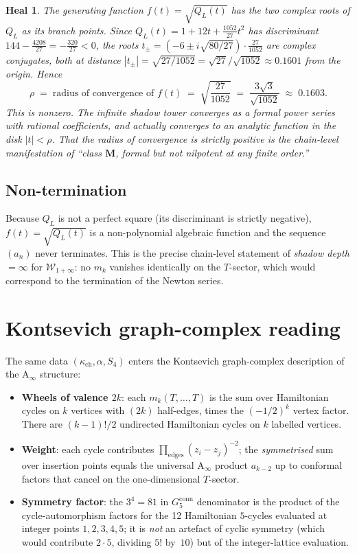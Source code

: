 \documentclass[11pt]{article}
\newtheorem*{heal}{Heal}
\newcommand{\kch}{\kappa_{\mathrm{ch}}}
\newcommand{\Winf}{\mathcal{W}_{1+\infty}}
\newcommand{\conn}{\mathrm{conn}}
\begin{document}
\begin{heal}
The generating function $f(t)=\sqrt{Q_L(t)}$ has the two complex
roots of $Q_L$ as its branch points. Since $Q_L(t) =
1 + 12t + \tfrac{1052}{27}t^2$ has discriminant
$144-\tfrac{4208}{27} = -\tfrac{320}{27} < 0$, the roots
$t_\pm = (-6\pm i\sqrt{80/27})\cdot\tfrac{27}{1052}$ are complex
conjugates, both at distance
$|t_\pm| = \sqrt{27/1052}=\sqrt{27}/\sqrt{1052}\approx 0.1601$
from the origin. Hence
\[
\rho\;=\;\text{radius of convergence of }f(t)\;=\;\sqrt{\frac{27}{1052}}
\;=\;\frac{3\sqrt{3}}{\sqrt{1052}}\;\approx\;0.1603.
\]
This is nonzero. The infinite shadow tower converges as a formal
power series with rational coefficients, and actually converges
to an analytic function in the disk $|t|<\rho$. That the radius of
convergence is strictly positive is the chain-level manifestation of
``class $\mathbf{M}$, formal but not nilpotent at any finite order.''
\end{heal}

\subsection{Non-termination}

Because $Q_L$ is not a perfect square (its discriminant is strictly
negative), $f(t)=\sqrt{Q_L(t)}$ is a non-polynomial algebraic function
and the sequence $(a_n)$ never terminates. This is the precise
chain-level statement of \emph{shadow depth $=\infty$} for $\Winf$:
no $m_k$ vanishes identically on the $T$-sector, which would
correspond to the termination of the Newton series.

\section{Kontsevich graph-complex reading}

The same data $(\kch,\alpha,S_4)$ enters the
Kontsevich graph-complex description of the A$_\infty$ structure:
\begin{itemize}
\item \textbf{Wheels of valence $2k$}: each $m_k(T,\ldots,T)$ is the
sum over Hamiltonian cycles on $k$ vertices with $(2k)$ half-edges,
times the $(-1/2)^k$ vertex factor. There are $(k-1)!/2$ undirected
Hamiltonian cycles on $k$ labelled vertices.
\item \textbf{Weight}: each cycle contributes
$\prod_{\text{edges}}(z_i-z_j)^{-2}$; the \emph{symmetrised} sum over
insertion points equals the universal A$_\infty$ product $a_{k-2}$
up to conformal factors that cancel on the one-dimensional
$T$-sector.
\item \textbf{Symmetry factor}: the $3^4=81$ in $G_5^\conn$ denominator
is the product of the cycle-automorphism factors for the 12 Hamiltonian
$5$-cycles evaluated at integer points $1,2,3,4,5$; it is
\emph{not} an artefact of cyclic symmetry (which would contribute
$2\cdot 5$, dividing $5!$ by~$10$) but of the integer-lattice
evaluation.
\end{itemize}
\end{document}
